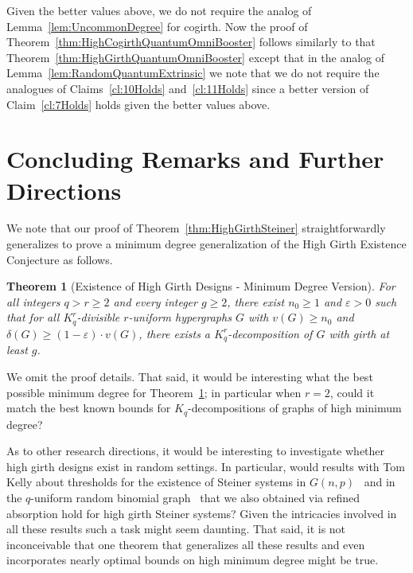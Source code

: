 \documentclass[11pt]{article}
\newcounter{i}
\theoremstyle{plain}
\newtheorem{thm}{Theorem}[section]
\theoremstyle{plain} %
\theoremstyle{definition}
\newcommand{\LP}[1]{\textcolor{Red}{ $\blacktriangleright$\ {\sf LP: #1}\
  $\blacktriangleleft$ }}
\begin{document}
Given the better values above, we do not require the analog of Lemma~\ref{lem:UncommonDegree} for cogirth. Now the proof of Theorem~\ref{thm:HighCogirthQuantumOmniBooster} follows similarly to that Theorem~\ref{thm:HighGirthQuantumOmniBooster} except that in the analog of Lemma~\ref{lem:RandomQuantumExtrinsic} we note that we do not require the analogues of Claims~\ref{cl:10Holds} and~\ref{cl:11Holds} since a better version of Claim~\ref{cl:7Holds} holds given the better values above. 

\section{Concluding Remarks and Further Directions}\label{s:Conclusion}

We note that our proof of Theorem~\ref{thm:HighGirthSteiner} straightforwardly generalizes to prove a minimum degree generalization of the High Girth Existence Conjecture as follows.

\begin{thm}[Existence of High Girth  Designs - Minimum Degree Version]\label{thm:HighGirthMinDegree}
For all integers $q > r \geq 2$ and every integer $g\ge 2$, there exist $n_0 \ge 1$ and $\varepsilon > 0$ such that for all $K_q^r$-divisible $r$-uniform hypergraphs $G$ with $v(G)\ge n_0$ and $\delta(G) \ge (1-\varepsilon)\cdot v(G)$, there exists a $K_q^r$-decomposition of $G$ with girth at least $g$.
\end{thm}

We omit the proof details. That said, it would be interesting what the best possible minimum degree for Theorem~\ref{thm:HighGirthMinDegree}; in particular when $r=2$, could it match the best known bounds for $K_q$-decompositions of graphs of high minimum degree?


As to other research directions, it would be interesting to investigate whether high girth designs exist in random settings. In particular, would results with Tom Kelly about thresholds for the existence of Steiner systems in $G(n,p)$~\cite{DKPIII} and in the $q$-uniform random binomial graph~\cite{DKPIV} that we also obtained via refined absorption hold for high girth Steiner systems? Given the intricacies involved in all these results such a task might seem daunting. That said, it is not inconceivable that one theorem that generalizes all these results and even incorporates nearly optimal bounds on high minimum degree might be true.




\end{document}
